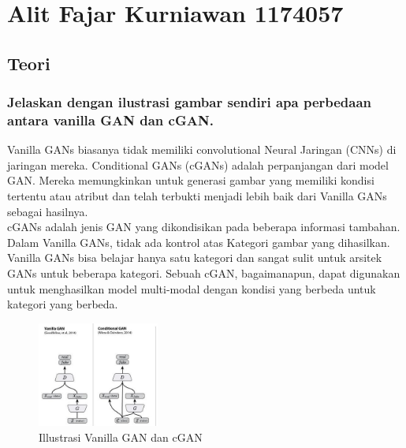 \section{Alit Fajar Kurniawan 1174057}

\subsection{Teori}
\subsubsection{Jelaskan dengan ilustrasi gambar sendiri apa perbedaan antara vanilla GAN dan cGAN.}
Vanilla GANs biasanya tidak memiliki convolutional Neural Jaringan (CNNs) di jaringan mereka.
Conditional GANs (cGANs) adalah perpanjangan dari model GAN. Mereka memungkinkan untuk generasi gambar yang memiliki kondisi tertentu atau atribut dan telah terbukti menjadi lebih baik dari Vanilla GANs sebagai hasilnya. \\
cGANs adalah jenis GAN yang dikondisikan pada beberapa informasi tambahan. Dalam Vanilla GANs, tidak ada kontrol atas Kategori gambar yang dihasilkan. Vanilla GANs bisa belajar hanya satu kategori dan sangat sulit untuk arsitek GANs untuk beberapa kategori. Sebuah cGAN, bagaimanapun, dapat digunakan untuk menghasilkan model multi-modal dengan kondisi yang berbeda untuk kategori yang berbeda.
	\hfill \break
	\begin{figure}[H]
		\includegraphics[width=4cm]{figures/1174057/chapter9/1.jpg}
		\centering
		\caption{Illustrasi Vanilla GAN dan cGAN}
	\end{figure}

